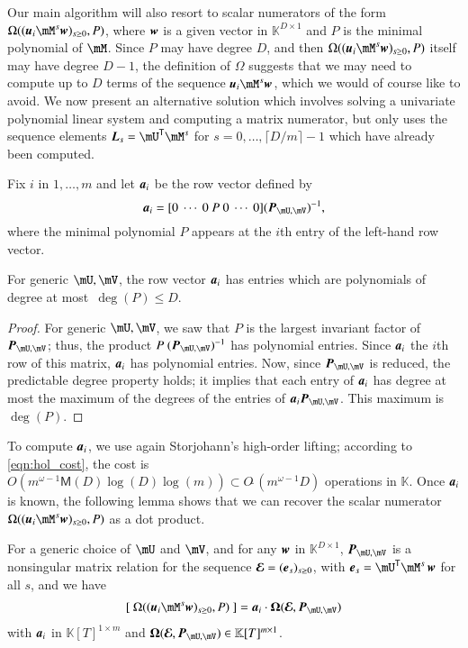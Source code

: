 \documentclass[final,1p,times,authoryear]{elsarticle}
\newcommand{\var}{T} %
\newcommand{\mat}[1]{\bm{\MakeUppercase{#1}}} %
\newcommand{\row}[1]{\bm{\MakeLowercase{#1}}} %
\newcommand{\col}[1]{\bm{\MakeLowercase{#1}}} %
\newcommand{\softO}[1]{O{\tilde{~}}(#1)} %
\newcommand{\minpoly}{P}
\newcommand{\trsp}[1]{#1^{\mathsf{T}}} %
\def\M {\ensuremath{\mathsf{M}}}
\def\K{\mathbb{K}}
\def\K {\ensuremath{\mathbb{K}}}
\newcommand{\mUt}{\trsp{\mU}}
\begin{document}
Our main algorithm will also resort to scalar numerators of
the form $\Omega((\row{u}_i \mM^s \col{w})_{s \ge 0},
\minpoly)$, where $\row{w}$ is a given vector in $\K^{D \times 1}$ and
$\minpoly$ is the minimal polynomial of $\mM$. Since $\minpoly$ may
have degree $D$, and then $\Omega((\row{u}_i \mM^s \col{w})_{s \ge 0},
\minpoly)$ itself may have degree $D-1$,
the definition of $\Omega$ suggests that we
may need to compute up to $D$ terms of the sequence $\row{u}_i \mM^s
\col{w}$, which we would of course like to avoid. We now present an
alternative solution which involves solving a univariate polynomial linear system
and computing a matrix numerator, but only uses the sequence elements
$\mat{L}_s= \mUt \mM^s$ for $s=0,\dots,\lceil D/m \rceil-1$
which have already been computed.

Fix $i$ in $1,\dots,m$ and let $\row{a}_i$ be the row vector defined
by $$\row{a}_i =[0~\cdots~0~\minpoly~0~\cdots~0]  (\mat{P}_{\mU,\mV})^{-1} ,$$
where the minimal polynomial $\minpoly$ appears at the $i$th entry  of the
left-hand row vector. 
\begin{lemma}\label{utilde}
  For generic $\mU,\mV$, the row vector $\row{a}_i$ has entries which are
  polynomials of degree at most~$\deg(P) \le D$.
\end{lemma}
\begin{proof}
  For generic $\mU,\mV$, we saw that $\minpoly$ is the largest invariant factor
  of $ \mat{P}_{\mU,\mV}$; thus, the product $\minpoly\
  (\mat{P}_{\mU,\mV})^{-1}$ has polynomial entries. Since $\row{a}_i$ the $i$th
  row of this matrix, $\row{a}_i$ has polynomial entries.  Now, since
  $\mat{P}_{\mU,\mV}$ is reduced, the predictable degree property
  \citep[Theorem~6.3-13]{Kailath80} holds; it implies that each entry of
  $\row{a}_i$ has degree at most the maximum of the degrees of the entries of
  $\row{a}_i\mat{P}_{\mU,\mV}$. This maximum is $\deg(\minpoly)$.
\end{proof}
To compute $\row{a}_i$, we use again Storjohann's high-order lifting;
according to \cref{eqn:hol_cost}, the cost is $ O(m^{\omega-1} \M(D)
\log(D) \log(m)) \subset \softO{m^{\omega-1}D}$ operations in $\K$.
Once $\row{a}_i$ is known, the following lemma shows that we can
recover the scalar numerator $\Omega((\row{u}_i \mM^s \col{w})_{s \ge
0}, \minpoly)$ as a dot product.
\begin{lemma}\label{lemma:omegaOmega}
  For a generic choice of $\mU$ and $\mV$, and for any $\col{w}$ in
  $\K^{D \times 1}$, $ \mat{P}_{\mU,\mV}$ is a nonsingular matrix
  relation for the sequence $\mat{\mathcal{E}} =
  (\col{e}_s)_{s\ge0}$, with $\col{e}_s=\mUt \mM^s\, \col{w}$
  for all $s$, and we have
  \begin{align}\label{eq:OmegaOmega}
    [~\Omega((\row{u}_i \mM^s \col{w})_{s \ge 0}, \minpoly)~] = \row{a}_i\cdot \mat{\Omega}(\mat{\mathcal{E}}, \mat{P}_{\mU,\mV})
  \end{align}
  with $\row{a}_i$ in $\K[\var]^{1 \times m}$ and 
  $\mat{\Omega}(\mat{\mathcal{E}} , \mat{P}_{\mU,\mV}) \in \K[\var]^{m \times 1}$.
\end{lemma}
\end{document}

